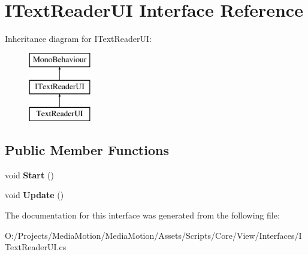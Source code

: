 \hypertarget{interface_i_text_reader_u_i}{\section{I\+Text\+Reader\+U\+I Interface Reference}
\label{interface_i_text_reader_u_i}
}
Inheritance diagram for I\+Text\+Reader\+U\+I\+:\begin{figure}[H]
\begin{center}
\leavevmode
\includegraphics[height=3.000000cm]{interface_i_text_reader_u_i}
\end{center}
\end{figure}
\subsection*{Public Member Functions}
\begin{DoxyCompactItemize}
\item 
\hypertarget{interface_i_text_reader_u_i_a20c28d7da72fbca6e767bc1c67ef10c9}{void {\bfseries Start} ()}\label{interface_i_text_reader_u_i_a20c28d7da72fbca6e767bc1c67ef10c9}

\item 
\hypertarget{interface_i_text_reader_u_i_a1145f947f32e7ec05bac43c4cfd55b4f}{void {\bfseries Update} ()}\label{interface_i_text_reader_u_i_a1145f947f32e7ec05bac43c4cfd55b4f}

\end{DoxyCompactItemize}


The documentation for this interface was generated from the following file\+:\begin{DoxyCompactItemize}
\item 
O\+:/\+Projects/\+Media\+Motion/\+Media\+Motion/\+Assets/\+Scripts/\+Core/\+View/\+Interfaces/I\+Text\+Reader\+U\+I.\+cs\end{DoxyCompactItemize}
